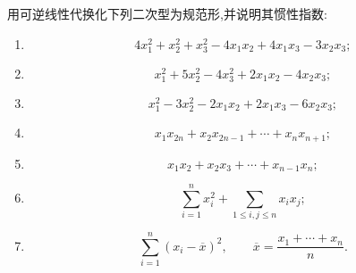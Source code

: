\begin{example}
用可逆线性代换化下列二次型为规范形,并说明其惯性指数:
\begin{enumerate}
    \item
    \[
    4x_1^2+x_2^2+x_3^2-4x_1x_2+4x_1x_3-3x_2x_3;
    \]
    \item
    \[
    x_1^2+5x_2^2-4x_3^2+2x_1x_2-4x_2x_3;
    \]
    \item
    \[
    x_1^2-3x_2^2-2x_1x_2+2x_1x_3-6x_2x_3;
    \]
    \item
    \[
    x_1x_{2n}+x_2x_{2n-1}+\cdots+x_nx_{n+1};
    \]
    \item
    \[
    x_1x_2+x_2x_3+\cdots+x_{n-1}x_n;
    \]
    \item
    \[
    \displaystyle\sum\limits_{i=1}^{n}x_i^2+
    \sum\limits_{1\le i,j\le n}x_ix_j;
    \]
    \item
    \[
    \displaystyle\sum\limits_{i=1}^{n}(x_i-\overline x)^2,
    \qquad
    \overline x=\dfrac{x_1+\cdots+x_n}{n}.
    \]
\end{enumerate}
\end{example}
\exampleblank

